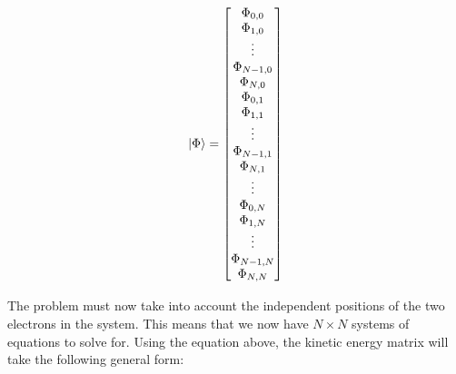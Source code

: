 \documentclass[10pt, oneside, letterpaper]{article}
\begin{document}
\begin{align*}
\ket{\Phi} =
\begin{bmatrix}
\Phi_{0,0}    \\
\Phi_{1,0}    \\
\vdots        \\
\Phi_{N-1,0}  \\ 
\Phi_{N,0}    \\
\Phi_{0,1}    \\
\Phi_{1,1}    \\
\vdots        \\
\Phi_{N-1,1}  \\ 
\Phi_{N,1}    \\
\vdots        \\
\Phi_{0,N}    \\
\Phi_{1,N}    \\
\vdots        \\
\Phi_{N-1,N}  \\
\Phi_{N,N}    \\ 
\end{bmatrix}
\end{align*}

The problem must now take into account the independent positions of the two electrons in the system. This means that we now have $N \times N$ systems of equations to solve for. Using the equation above, the kinetic energy matrix will take the following general form:
\end{document}

